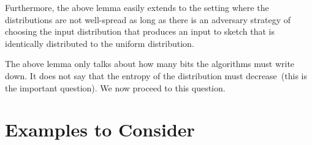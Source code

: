 \documentclass[11pt]{article}
\begin{document}
Furthermore, the above lemma easily extends to the setting where the distributions are not well-spread as long as there is an adversary strategy of choosing the input distribution that produces an input to sketch that is identically distributed to the uniform distribution.

The above lemma only talks about how many bits the algorithms must write down.  It does not say that the entropy of the distribution must decrease~(this is the important question).  We now proceed to this question.


\section{Examples to Consider}
\end{document}
